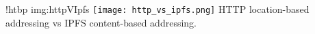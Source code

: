 \namedfigure
{!htbp}
{img:httpVIpfs}
{\texttt{[image: http\_vs\_ipfs.png]}}
{HTTP location-based addressing vs IPFS content-based addressing.}
